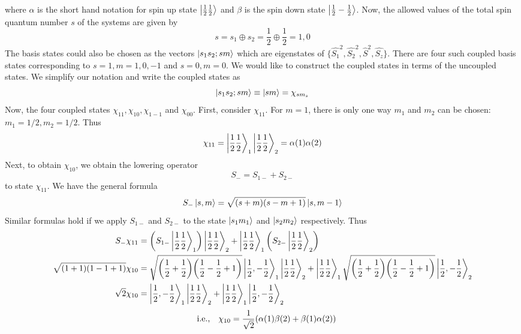 where $\alpha$ is the short hand notation for spin up state $\ket{\frac{1}{2} \frac{1}{2}}$ and $\beta$ is the spin down state $\ket{\frac{1}{2} -\frac{1}{2}}$. Now, the  allowed values of the total spin quantum number $s$ of the systems are given by 
\begin{equation*}
s = s_1 \oplus s_2 = \frac{1}{2} \oplus \frac{1}{2} = 1, 0
\end{equation*}
The basis states could also be chosen as the vectors $\ket{s_1 s_2; s m}$ which are eigenstates of $\{\hat{S_1}^2, \hat{S_2}^2, \hat{S}^2,\hat{S_z}\}$. There are four such coupled basis states corresponding to $s=1, m=1,0,-1$ and $s=0,m=0$. We would like to construct the coupled states in terms of the uncoupled states. We simplify our notation and write the coupled states as
\begin{equation*}
\ket{s_1 s_2; s m} \equiv \ket{s m} = \chi_{s m_s}
\end{equation*}
Now, the four coupled states $\chi_{11}, \chi_{10}, \chi_{1-1}$ and $\chi_{00}$. First, consider $\chi_{11}$. For $m=1$, there is only one way $m_1$ and $m_2$ can be chosen: $m_1=1/2, m_2=1/2$. Thus
\begin{equation}
\label{chapter19-eqn1-spin-half}
\chi_{11} = \ket{\frac{1}{2}\frac{1}{2}}_1 \ket{\frac{1}{2} \frac{1}{2}}_2 = \alpha(1) \alpha(2)
\end{equation}
Next, to obtain $\chi_{1 0}$, we obtain the lowering operator
\begin{equation*}
	S_{-} = S_{1-} + S_{2-}
\end{equation*}
to state $\chi_{11}$. We have the general formula
\begin{equation}
S_{-}\ket{s, m} = \sqrt{(s + m)(s - m + 1)} \ket{s, m-1}
\end{equation}
Similar formulas hold if we apply $S_{1-}$ and $S_{2-}$ to the state $\ket{s_1 m_1}$ and $\ket{s_2 m_2}$ respectively. Thus
\begin{align*}
S_{-} \chi_{11} &= \qty(S_{1-}\ket{\frac{1}{2}\frac{1}{2}}_1)\ket{\frac{1}{2}\frac{1}{2}}_2 + \ket{\frac{1}{2}\frac{1}{2}}_1\qty(S_{2-}\ket{\frac{1}{2}\frac{1}{2}}_2)\\
\sqrt{(1 + 1)(1 - 1 + 1)} \chi_{1 0} &= \sqrt{\qty(\frac{1}{2}+\frac{1}{2})\qty(\frac{1}{2} - \frac{1}{2} + 1)} \ket{\frac{1}{2},-\frac{1}{2}}_1\ket{\frac{1}{2} \frac{1}{2}}_2 + \ket{\frac{1}{2} \frac{1}{2}}_1 \sqrt{\qty(\frac{1}{2}+\frac{1}{2})\qty(\frac{1}{2} - \frac{1}{2} + 1)}\ket{\frac{1}{2},-\frac{1}{2}}_2 \\
\sqrt{2} \chi_{1 0} &= \ket{\frac{1}{2},-\frac{1}{2}}_1 \ket{\frac{1}{2} \frac{1}{2}}_2 + \ket{\frac{1}{2} \frac{1}{2}}_1 \ket{\frac{1}{2},-\frac{1}{2}}_2
\end{align*}
\begin{equation}
\label{chapter19-eqn2-spin-half}
\qq{i.e.,}\chi_{1 0} = \frac{1}{\sqrt{2}} \qty(\alpha(1)\beta(2) + \beta(1)\alpha(2))
\end{equation}

